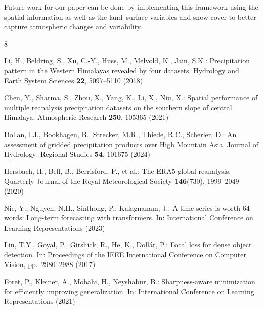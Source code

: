 \documentclass[runningheads]{llncs}
\begin{document}
Future work for our paper can be done by implementing this framework using the spatial information as well as the land–surface variables and snow cover to better capture atmospheric changes and variability.

\begin{thebibliography}{8}

Li, H., Beldring, S., Xu, C.-Y., Huss, M., Melvold, K., Jain, S.K.: 
Precipitation pattern in the Western Himalayas revealed by four datasets. 
Hydrology and Earth System Sciences \textbf{22}, 5097--5110 (2018)

Chen, Y., Sharma, S., Zhou, X., Yang, K., Li, X., Niu, X.: 
Spatial performance of multiple reanalysis precipitation datasets on the southern slope of central Himalaya. 
Atmospheric Research \textbf{250}, 105365 (2021)

Dollan, I.J., Bookhagen, B., Strecker, M.R., Thiede, R.C., Scherler, D.: 
An assessment of gridded precipitation products over High Mountain Asia. 
Journal of Hydrology: Regional Studies \textbf{54}, 101675 (2024)

Hersbach, H., Bell, B., Berrisford, P., et al.: The ERA5 global reanalysis. Quarterly Journal of the Royal Meteorological Society \textbf{146}(730), 1999--2049 (2020)

Nie, Y., Nguyen, N.H., Sinthong, P., Kalagnanam, J.: A time series is worth 64 words: Long-term forecasting with transformers. In: International Conference on Learning Representations (2023)

Lin, T.Y., Goyal, P., Girshick, R., He, K., Dollár, P.: Focal loss for dense object detection. In: Proceedings of the IEEE International Conference on Computer Vision, pp.~2980--2988 (2017)

Foret, P., Kleiner, A., Mobahi, H., Neyshabur, B.: Sharpness-aware minimization for efficiently improving generalization. In: International Conference on Learning Representations (2021)

\end{thebibliography}
\end{document}
